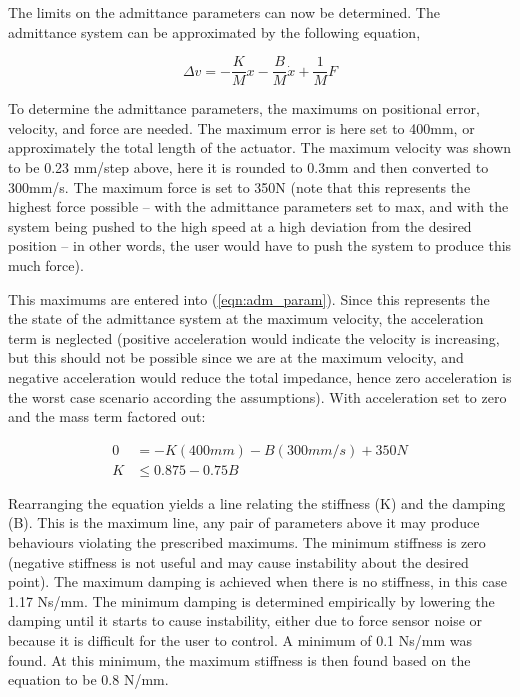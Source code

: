 \documentclass[12pt]{report}
\begin{document}
	The limits on the admittance parameters can now be determined. The admittance system can be approximated by the following equation, 
	
	\begin{equation} \label{eqn:adm_param}
		\Delta v = - \frac{K}{M}x - \frac{B}{M}\dot{x} + \frac{1}{M}F
	\end{equation}
	
	
	To determine the admittance parameters, the maximums on positional error, velocity, and force are needed. The maximum error is here set to 400mm, or approximately the total length of the actuator. The maximum velocity was shown to be 0.23 mm/step above, here it is rounded to 0.3mm and then converted to 300mm/s. The maximum force is set to 350N (note that this represents the highest force possible -- with the admittance parameters set to max, and with the system being pushed to the high speed at a high deviation from the desired position -- in other words, the user would have to push the system to produce this much force). 
	
	This maximums are entered into (\ref{eqn:adm_param}). Since this represents the the state of the admittance system at the maximum velocity, the acceleration term is neglected (positive acceleration would indicate the velocity is increasing, but this should not be possible since we are at the maximum velocity, and negative acceleration would reduce the total impedance, hence zero acceleration is the worst case scenario according the assumptions). With acceleration set to zero and the mass term factored out:
	
	\begin{align}
		0 &= -K(400mm) - B(300mm/s) + 350N \\
		K &\leq 0.875 - 0.75B  
	\end{align}
	
	Rearranging the equation yields a line relating the stiffness (K) and the damping (B). This is the maximum line, any pair of parameters above it may produce behaviours violating the prescribed maximums. The minimum stiffness is zero (negative stiffness is not useful and may cause instability about the desired point). The maximum damping is achieved when there is no stiffness, in this case 1.17 Ns/mm. The minimum damping is determined empirically by lowering the damping until it starts to cause instability, either due to force sensor noise or because it is difficult for the user to control. A minimum of 0.1 Ns/mm was found. At this minimum, the maximum stiffness is then found based on the equation to be 0.8 N/mm. 
	
\end{document}
